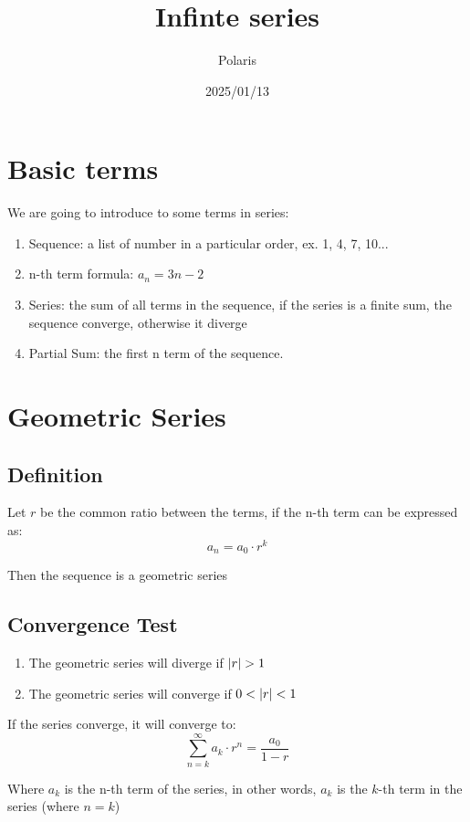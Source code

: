 \documentclass{article}
\title{Infinte series}
\author{Polaris}
\date{2025/01/13}
\numberwithin{equation}{section}
\begin{document}
\maketitle

\section{Basic terms}
We are going to introduce to some terms in series:
\begin{enumerate}
    \item Sequence: a list of number in a particular order, ex. {1, 4, 7, 10...}
    \item n-th term formula: $a_n = 3n - 2$
    \item Series: the sum of all terms in the sequence, if the series is a finite sum, the sequence converge, otherwise it diverge
    \item Partial Sum: the first n term of the sequence.
\end{enumerate}

\section{Geometric Series}
\subsection{Definition}
Let $r$ be the common ratio between the terms, if the n-th term can be expressed as:
\begin{equation}
    a_n = a_0\cdot r^k
\end{equation}

Then the sequence is a geometric series

\subsection{Convergence Test}
\begin{enumerate}
    \item The geometric series will diverge if $\abs{r} > 1$
    \item The geometric series will converge if $0 < \abs{r} < 1$
\end{enumerate}
If the series converge, it will converge to:
\begin{equation}
    \sum_{n = k}^\infty a_k \cdot r^n = \frac{a_0}{1 - r}
\end{equation}

Where $a_k$ is the n-th term of the series, in other words, $a_k$ is the $k$-th term in the series (where $n = k$)
\end{document}
